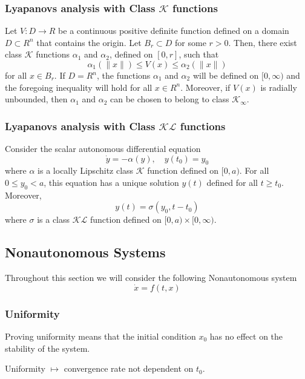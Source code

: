 \documentclass{article}
\begin{document}
\subsubsection{Lyapanovs analysis with Class $\mathcal{K}$ functions}
Let $V: D \rightarrow R$ be a continuous positive definite function defined on a domain $D \subset R^n$ that contains the origin. Let $B_r \subset D$ for some $r>0$. Then, there exist class $\mathcal{K}$ functions $\alpha_1$ and $\alpha_2$, defined on $[0, r]$, such that
\[
	\alpha_1(\|x\|) \leq V(x) \leq \alpha_2(\|x\|)
\]
for all $x \in B_r$. If $D=R^n$, the functions $\alpha_1$ and $\alpha_2$ will
be defined on $[0, \infty)$ and the foregoing inequality will hold for all $x
	\in R^n$. Moreover, if $V(x)$ is radially unbounded, then $\alpha_1$ and
$\alpha_2$ can be chosen to belong to class $\mathcal{K}_{\infty}$.
\subsubsection{Lyapanovs analysis with Class $\mathcal{K} \mathcal{L}$ functions}
Consider the scalar autonomous differential equation
$$
	\dot{y}=-\alpha(y), \quad y\left(t_0\right)=y_0
$$
where $\alpha$ is a locally Lipschitz class $\mathcal{K}$ function defined on $[0, a)$. For all $0 \leq y_0<a$, this equation has a unique solution $y(t)$ defined for all $t \geq t_0$. Moreover,
$$
	y(t)=\sigma\left(y_0, t-t_0\right)
$$
where $\sigma$ is a class $\mathcal{K} \mathcal{L}$ function defined on $[0, a) \times[0, \infty)$.
\subsection{Nonautonomous Systems}
Throughout this section we will consider the following Nonautonomous system
\begin{equation*}
	\dot x = f(t,x)
	\label{Nonautonomous system}
\end{equation*}
\subsubsection{Uniformity}
Proving uniformity means that the initial condition $x_0$ has no effect on the stability of the system.

Uniformity $\mapsto$ convergence rate not dependent on $t_0$.
\end{document}
